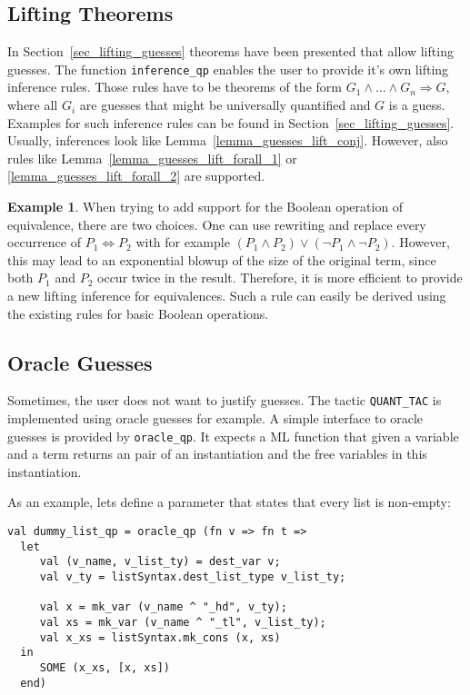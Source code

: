 \documentclass[a4paper,12pt,DIV=12,oneside]{scrbook}
\theoremstyle{definition}
\newtheorem{example}[lemma]{Example}
\theoremstyle{remark}
\begin{document}
\subsection{Lifting Theorems}

In Section~\ref{sec_lifting_guesses} theorems have been presented that
allow lifting guesses. The function \texttt{inference\_qp} enables the
user to provide it's own lifting inference rules. Those rules have to
be theorems of the form $G_1 \wedge \ldots \wedge G_n \Longrightarrow
G$, where all $G_i$ are guesses that might be universally quantified
and $G$ is a guess. Examples for such inference rules can be found in
Section~\ref{sec_lifting_guesses}. Usually, inferences look like
Lemma~\ref{lemma_guesses_lift_conj}. However, also rules like
Lemma~\ref{lemma_guesses_lift_forall_1} or
\ref{lemma_guesses_lift_forall_2} are supported.

\begin{example}
When trying to add support for the Boolean operation of equivalence,
there are two choices.  One can use rewriting and replace every
occurrence of $P_1 \Leftrightarrow P_2$ with for example $(P_1 \wedge
P_2) \vee (\neg P_1 \wedge \neg P_2)$. However, this may lead to an
exponential blowup of the size of the original term, since both $P_1$
and $P_2$ occur twice in the result. Therefore, it is more efficient to
provide a new lifting inference for equivalences. Such a rule can easily be derived
using the existing rules for basic Boolean operations.
\end{example}

\subsection{Oracle Guesses}

Sometimes, the user does not want to justify guesses. The tactic
\texttt{QUANT\_TAC} is implemented using oracle guesses for example.
A simple interface to oracle guesses is provided by \texttt{oracle\_qp}.
It expects a ML function that given a variable and a term returns
an pair of an instantiation and the free variables in this instantiation.

As an example, lets define a parameter that states that every list is non-empty:
{\scriptsize
\begin{verbatim}
val dummy_list_qp = oracle_qp (fn v => fn t =>
  let
     val (v_name, v_list_ty) = dest_var v;
     val v_ty = listSyntax.dest_list_type v_list_ty;

     val x = mk_var (v_name ^ "_hd", v_ty);
     val xs = mk_var (v_name ^ "_tl", v_list_ty);
     val x_xs = listSyntax.mk_cons (x, xs)
  in
     SOME (x_xs, [x, xs])
  end)
\end{verbatim}}
\end{document}
